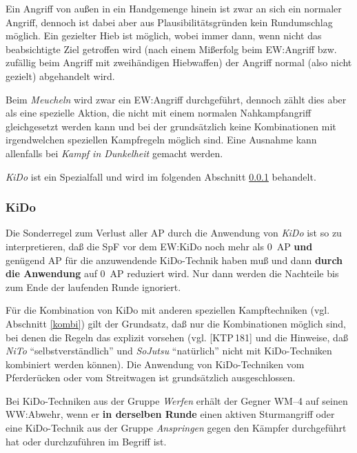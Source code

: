 \documentclass[10pt,a4paper,germanpar]{article}
\begin{document}
Ein Angriff von außen in ein Handgemenge hinein ist zwar an sich ein
normaler Angriff, dennoch ist dabei aber aus Plausibilitätsgründen
kein Rundumschlag möglich. Ein gezielter Hieb ist möglich, wobei immer
dann, wenn nicht das beabsichtigte Ziel getroffen wird (nach einem
Mißerfolg beim EW:Angriff bzw. zufällig beim Angriff mit zweihändigen
Hiebwaffen) der Angriff normal (also nicht gezielt) abgehandelt wird.

Beim \emph{Meucheln} wird zwar ein EW:Angriff durchgeführt, dennoch
zählt dies aber als eine spezielle Aktion, die nicht mit einem
normalen Nahkampfangriff gleichgesetzt werden kann und bei der
grundsätzlich keine Kombinationen mit irgendwelchen speziellen
Kampfregeln möglich sind. Eine Ausnahme kann allenfalls bei
\emph{Kampf in Dunkelheit} gemacht werden.

\emph{KiDo} ist ein Spezialfall und wird im folgenden Abschnitt
\ref{kido} behandelt.

\subsubsection{KiDo}
\label{kido}

Die Sonderregel zum Verlust aller AP durch die Anwendung von
\emph{KiDo} ist so zu interpretieren, daß die SpF vor dem EW:KiDo noch
mehr als 0~AP \textbf{und} genügend AP für die anzuwendende
KiDo-Technik haben muß und dann \textbf{durch die Anwendung} auf 0~AP
reduziert wird. Nur dann werden die Nachteile bis zum Ende der
laufenden Runde ignoriert.

Für die Kombination von KiDo mit anderen speziellen Kampftechniken
(vgl. Abschnitt \ref{kombi}) gilt der Grundsatz, daß nur die
Kombinationen möglich sind, bei denen die Regeln das explizit vorsehen
(vgl. [KTP\,181] und die Hinweise, daß \emph{NiTo}
"`selbstverständlich"' und \emph{SoJutsu} "`natürlich"' nicht mit
KiDo-Techniken kombiniert werden können). Die Anwendung von
KiDo-Techniken vom Pferderücken oder vom Streitwagen ist grundsätzlich
ausgeschlossen.

Bei KiDo-Techniken aus der Gruppe \emph{Werfen} erhält der Gegner
WM--4 auf seinen WW:Abwehr, wenn er \textbf{in derselben Runde} einen
aktiven Sturmangriff oder eine KiDo-Technik aus der Gruppe
\emph{Anspringen} gegen den Kämpfer durchgeführt hat oder
durchzuführen im Begriff ist.
\end{document}
